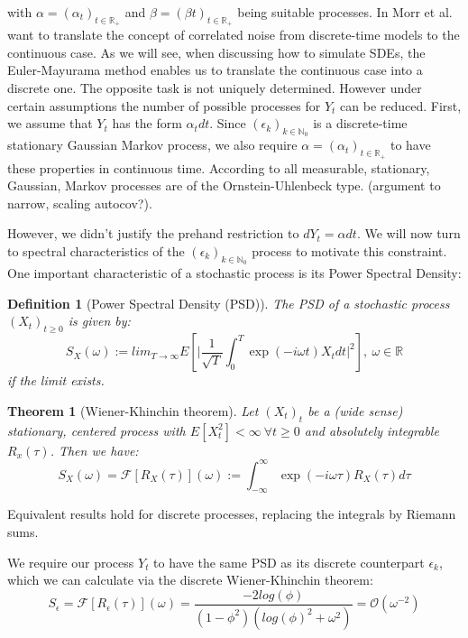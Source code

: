 \documentclass[%
thesis=student,%
coverpage=false,%
titlepage=false,%
headmarks=true, %
english,%
font=libertine, %
math=newpxtx, %
BCOR=5mm,%
coverBCOR=11mm%
]{tumbook}
\newtheorem{definition}{Definition}[section]
\newtheorem{theorem}{Theorem}
\begin{document}
with $\alpha = (\alpha_{t})_{t\in\mathbb{R}_{+}}$ and $\beta = (\beta{t})_{t\in\mathbb{R}_{+}}$ being suitable processes.
In \cite{Morr:2022} Morr et al. want to translate the concept of correlated noise from discrete-time models to the continuous case. As we will see, when discussing how to simulate SDEs, the Euler-Mayurama method enables us to translate the continuous case into a discrete one. The opposite task is not uniquely determined. However under certain assumptions the number of possible processes for $Y_{t}$ can be reduced. First, we assume that $Y_{t}$ has the form $\alpha_{t}dt$. Since $(\epsilon_{k})_{k\in\mathbb{N}_{0}}$ is a discrete-time stationary Gaussian Markov process, we also require $\alpha = (\alpha_{t})_{t\in\mathbb{R}_{+}}$ to have these properties in continuous time. According to \cite{doob:1942} all measurable, stationary, Gaussian, Markov processes are of the Ornstein-Uhlenbeck type. (argument to narrow, scaling autocov?).

However, we didn't justify the prehand restriction to $dY_{t} = \alpha dt$. We will now turn to spectral characteristics of the $(\epsilon_{k})_{k\in\mathbb{N}_{0}}$ process to motivate this constraint. One important characteristic of a stochastic process is its Power Spectral Density:


\begin{definition}[Power Spectral Density (PSD)]
The PSD of a stochastic process $(X_{t})_{t \geq 0}$ is given by:
\[
S_{X}(\omega) := lim_{T\rightarrow\infty}E[\lvert \frac{1}{\sqrt{T}}\int_{0}^{T}\exp(-i\omega t)X_{t}dt\rvert^{2}], \ \omega \in \mathbb{R}
\]
if the limit exists.
\end{definition}

\begin{theorem}[Wiener-Khinchin theorem]
Let $(X_{t})_{t}$ be a (wide sense) stationary, centered process with $E[X_{t}^2]<\infty \ \forall t \geq 0$ and absolutely integrable $R_{x}(\tau)$. Then we have:
\[
S_{X}(\omega) = \mathcal{F}[R_{X}(\tau)](\omega) := \int_{-\infty}^{\infty}\exp(-i\omega\tau)R_{X}(\tau)d\tau
\]
\end{theorem}

Equivalent results hold for discrete processes, replacing the integrals by Riemann sums.

We require our process $Y_{t}$ to have the same PSD as its discrete counterpart $\epsilon_{k}$, which we can calculate via the discrete Wiener-Khinchin theorem:
\[
S_{\epsilon} = \mathcal{F}[R_{\epsilon}(\tau)](\omega) = \frac{-2log(\phi)}{(1-\phi^{2})(log(\phi)^{2}+\omega^{2})} = \mathcal{O}(\omega^{-2})
\]
\end{document}
